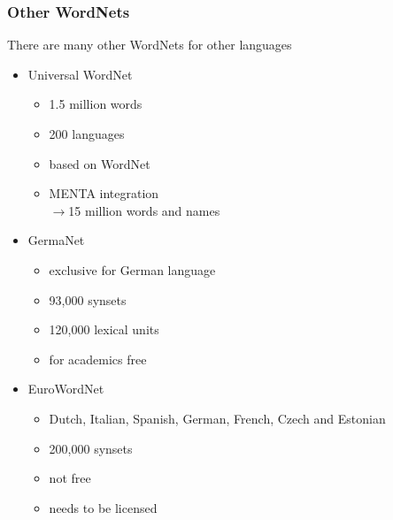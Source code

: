 \begin{frame}
\frametitle{Other WordNets}
There are many other WordNets for other languages
\begin{itemize}
\item Universal WordNet
\begin{itemize}
\item 1.5 million words
\item 200 languages
\item based on WordNet
\item MENTA integration\\
$\rightarrow$15 million words and names
\end{itemize}
\item GermaNet
\begin{itemize}
\item exclusive for German language
\item 93,000 synsets
\item 120,000 lexical units
\item for academics free
\end{itemize}
\item EuroWordNet
\begin{itemize}
\item Dutch, Italian, Spanish, German, French, Czech and Estonian
\item 200,000 synsets
\item not free
\item needs to be licensed
\end{itemize}
\end{itemize}
\end{frame}